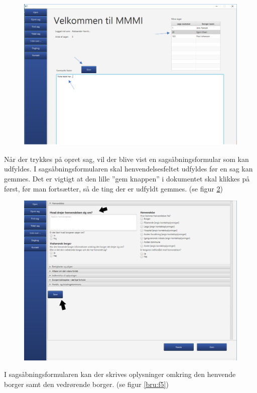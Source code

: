 \begin{figure}[htb!]
  \includegraphics[width = \linewidth]{./PNG/brugervejledning/figur3.PNG} 
  \caption{}  
  \label{bru:f3}
\end{figure}
\newpage
Når der trykkes på opret sag, vil der blive vist en sagsåbningsformular som kan udfyldes. I sagsåbningsformularen skal henvendelsesfeltet udfyldes før en sag kan gemmes. Det er vigtigt at den lille ”gem knappen” i dokumentet skal klikkes på først, før man fortsætter, så de ting der er udfyldt gemmes. (se figur \ref{bru:f4})
\begin{figure}[htb!]
  \includegraphics[width = \linewidth]{./PNG/brugervejledning/figur4.PNG} 
  \caption{}  
  \label{bru:f4}
\end{figure}
\newpage
I sagsåbningsformularen kan der skrives oplysninger omkring den henvende borger samt den vedrørende borger. (se figur \ref{bru:f5})
